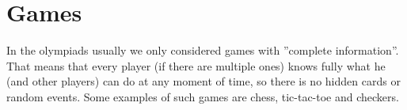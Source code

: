 \chapter{Games}

In the olympiads usually we only considered games with ''complete information''. That means that every player (if there are multiple ones) knows fully what he (and other players) can do at any moment of time, so there is no hidden cards or random events. Some examples of such games are chess, tic-tac-toe and checkers.

